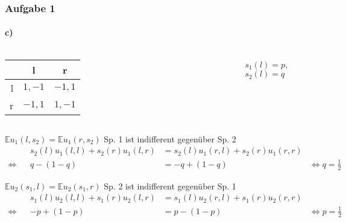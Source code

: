 \documentclass{beamer}
\newcommand{\E}{\mathbb{E}}
\begin{document}
\begin{frame}
\frametitle{Aufgabe 1}
\framesubtitle{c)}

\begin{columns}
\begin{tabular}{r|c|c|}
    & l & r \\
    \hline
l & $ 1,-1$ & $-1, 1$ \\
r & $-1, 1$ & $ 1,-1$ \\
    \hline
\end{tabular}

$s_1(l) = p$, $s_2(l) = q$
\end{columns}

\begin{block}{$\E u_1(l, s_2) = \E u_1(r, s_2)$ \hfill Sp. 1 ist indifferent gegenüber Sp. 2}
\begin{align*}
    & & s_2(l)u_1(l,l) + s_2(r)u_1(l,r) & = s_2(l)u_1(r,l) + s_2(r)u_1(r,r) & \\
\Leftrightarrow &
    & q - (1-q) & = -q + (1-q) &
\Leftrightarrow
    q = \frac{1}{2}
\end{align*}
\end{block}

\begin{block}{$\E u_2(s_1, l) = \E u_2(s_1, r)$ \hfill Sp. 2 ist indifferent gegenüber Sp. 1}
\begin{align*}
    & & s_1(l)u_2(l,l) + s_1(r)u_2(l,r) & = s_1(l)u_2(r,l) + s_1(r)u_2(r,r) & \\
\Leftrightarrow &
    & -p + (1-p) & = p - (1-p) &
\Leftrightarrow
    p = \frac{1}{2}
\end{align*}
\end{block}
\end{frame}
\end{document}
